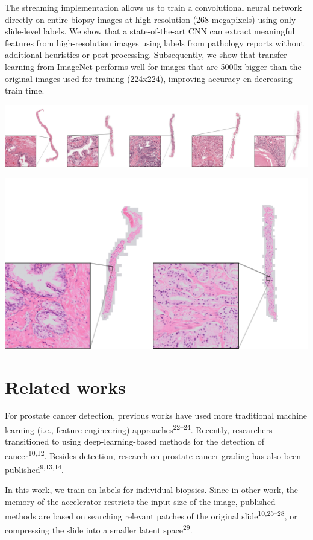 \documentclass[
  12pt,
  a5,margin=2cmpaper,
]{article}
\begin{document}
The streaming implementation allows us to train a convolutional neural
network directly on entire biopsy images at high-resolution (268
megapixels) using only slide-level labels. We show that a
state-of-the-art CNN can extract meaningful features from
high-resolution images using labels from pathology reports without
additional heuristics or post-processing. Subsequently, we show that
transfer learning from ImageNet performs well for images that are 5000x
bigger than the original images used for training (224x224), improving
accuracy en decreasing train time.

\includegraphics{chpt3_imgs/data_overview.png}

\includegraphics{chpt3_imgs/overview_olympus.png}

\hypertarget{related-works}{%
\section{Related works}\label{related-works}}

For prostate cancer detection, previous works have used more traditional
machine learning (i.e., feature-engineering)
approaches\textsuperscript{22--24}. Recently, researchers transitioned
to using deep-learning-based methods for the detection of
cancer\textsuperscript{10,12}. Besides detection, research on prostate
cancer grading has also been published\textsuperscript{9,13,14}.

In this work, we train on labels for individual biopsies. Since in other
work, the memory of the accelerator restricts the input size of the
image, published methods are based on searching relevant patches of the
original slide\textsuperscript{10,25--28}, or compressing the slide into
a smaller latent space\textsuperscript{29}.
\end{document}
